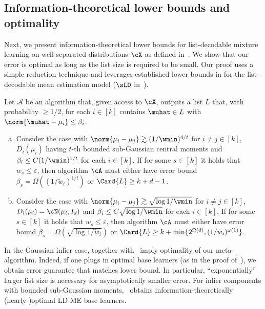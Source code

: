 \subsection{Information-theoretical lower bounds and optimality}

Next, we present information-theoretical lower bounds for list-decodable mixture learning on well-separated distributions $\cX$ as defined in~. 
We show that our error is optimal as long as the list size is required to be small. Our proof uses a simple reduction technique and leverages established lower bounds in \cite{diakonikolas2018list}  for the list-decodable mean estimation model (\(\sLD\) in~).


\begin{proposition}
\label{lemma:it_lb_ours}
Let \(\mathcal{A}\) be an algorithm that, 
given access to $\cX$, outputs
a list \(L\) that, with probability \(\geq 1/2\), for each \(i \in [k]\) contains  \(\muhat \in L\) with $\norm{\muhat - \mu_i} \leq \beta_i$.
\begin{enumerate}[(a)]

\item Consider the case with \(\norm{\mu_i - \mu_j} \gtrsim (1 / \wmin)^{4/t}\) for \(i \neq j \in [k]\), \(D_i(\mu_i)\) having \(t\)-th bounded sub-Gaussian central moments and $\beta_i \leq C (1/\wmin)^{1/t}$ for each $i \in [k]$. If for some \(s \in [k]\) it holds that \(w_s \leq \varepsilon\), then 
algorithm $\cA$ must either have error bound $\beta_s = \Omega((1 / \tilde w_i)^{1/t})$
or $\Card{L} \geq k+d - 1$.

    \item Consider the case with \(\norm{\mu_i - \mu_j} \gtrsim \sqrt{\log 1 / \wmin}\) for \(i \neq j \in [k]\), \(D_i(\mu_i) = \cN(\mu_i, I_d)\) and $\beta_i \leq C \sqrt{\log 1/\wmin}$ for each $i \in [k]$.
    If for some \(s \in [k]\) 
it holds that \(w_s \leq \varepsilon\), then
algorithm $\cA$ must either have error bound $\beta_s = \Omega(\sqrt{\log 1 / \tilde w_i})$
or $\Card{L} \geq k+\min\{2^{\Omega(d)}, (1 / \tilde w_i)^{\omega(1)}\}$.
\end{enumerate}

\end{proposition}
In the Gaussian inlier case,
 together with~ imply optimality of our meta-algorithm. Indeed, if one plugs in optimal base learners (as in the proof of~), we obtain error guarantee that matches lower bound. 
In particular, ``exponentially'' larger list size is necessary for asymptotically smaller error. For inlier components with bounded sub-Gaussian moments,~\cite{diakonikolas2018list} obtains information-theoretically (nearly-)optimal LD-ME base learners. 


